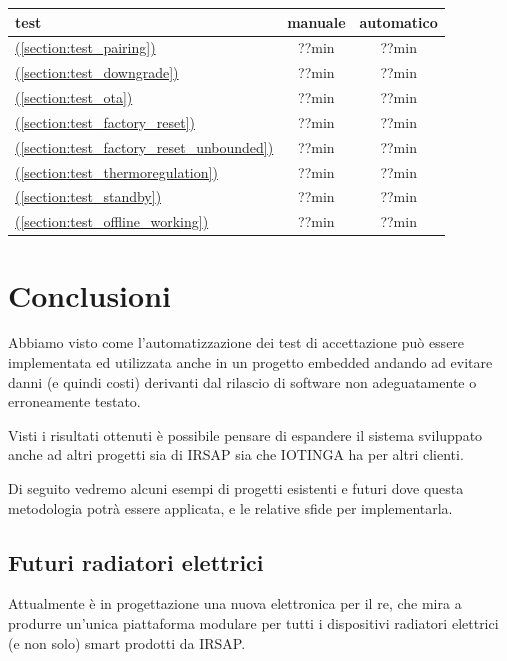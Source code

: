 \documentclass[12pt,a4paper,twoside,titlepage]{book}
\newcommand*{\fullref}[1]{\hyperref[{#1}]{\nameref*{#1} (\ref*{#1})}}
\begin{document}
\begin{center}
\begin{tabular}{| l | c | c |}
    \hline
    \textbf{test} & \textbf{manuale} & \textbf{automatico} \\ \hline
    \fullref{section:test_pairing} & ??min & ??min \\ \hline
    \fullref{section:test_downgrade} & ??min & ??min \\ \hline
    \fullref{section:test_ota} & ??min & ??min \\ \hline
    \fullref{section:test_factory_reset} & ??min & ??min \\ \hline
    \fullref{section:test_factory_reset_unbounded} & ??min & ??min \\ \hline 
    \fullref{section:test_thermoregulation} & ??min & ??min \\ \hline 
    \fullref{section:test_standby} & ??min & ??min \\ \hline 
    \fullref{section:test_offline_working} & ??min & ??min \\ \hline 
\end{tabular}
\end{center}

\chapter{Conclusioni}

Abbiamo visto come l'automatizzazione dei test di accettazione può essere implementata
ed utilizzata anche in un progetto embedded andando ad evitare danni (e quindi costi)
derivanti dal rilascio di software non adeguatamente o erroneamente testato.

Visti i risultati ottenuti è possibile pensare di espandere il sistema sviluppato
anche ad altri progetti sia di IRSAP sia che IOTINGA ha per altri clienti.

Di seguito vedremo alcuni esempi di progetti esistenti e futuri dove questa metodologia
potrà essere applicata, e le relative sfide per implementarla.

\section{Futuri radiatori elettrici}

Attualmente è in progettazione una nuova elettronica per il \Gls{re},
che mira a produrre un'unica piattaforma modulare per tutti i dispositivi radiatori elettrici
(e non solo) smart prodotti da IRSAP.
\end{document}
